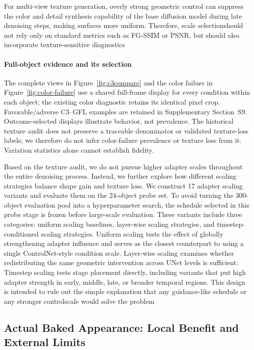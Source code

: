 \documentclass[times,twocolumn,final]{elsarticle}
\providecommand{\DIFadd}[1]{{\protect\color{blue} \sf #1}} %
\providecommand{\DIFdel}[1]{{\protect\color{red} \scriptsize #1}} %
\providecommand{\DIFaddbegin}{} %
\providecommand{\DIFaddend}{} %
\providecommand{\DIFdelbegin}{} %
\providecommand{\DIFdelend}{} %
\begin{document}
\DIFdelbegin \DIFdel{For multi-view texture generation, overly strong geometric control can suppress the color and detail synthesis capability of the base diffusion model during late denoising steps, making surfaces more uniform. Therefore, scale selectionshould not rely only on standard metrics such as FG-SSIM or PSNR, but should also incorporate texture-sensitive diagnostics}\DIFdelend \DIFaddbegin \paragraph{Full-object evidence and its selection}
\DIFadd{The complete views in Figure~\ref{fig:c3compare} and the color failure in Figure~\ref{fig:color-failure} use a shared full-frame display for every condition within each object; the existing color diagnostic retains its identical pixel crop. Favorable/adverse C3--GFL examples are retained in Supplementary Section~S9. Outcome-selected displays illustrate behavior, not prevalence. The historical texture audit does not preserve a traceable denominator or validated texture-loss labels; we therefore do not infer color-failure prevalence or texture loss from it. Variation statistics alone cannot establish fidelity}\DIFaddend .


\DIFdelbegin %

\DIFdel{Based on the texture audit, we do not pursue higher adapter scales throughout the entire denoising process. Instead, we further explore how different scaling strategies balance shape gain and texture loss. We construct 17 adapter scaling variants and evaluate them on the 24-object probe set. To avoid turning the 300-object evaluation pool into a hyperparameter search, the schedule selected in this probe stage is frozen before large-scale evaluation. These variants include three categories: uniform scaling baselines, layer-wise scaling strategies, and timestep-conditioned scaling strategies.
Uniform scaling tests the effect of globally strengthening adapter influence and serves as the closest counterpart to using a single ControlNet-style condition scale. Layer-wise scaling examines whether redistributing the same geometric intervention across UNet levels is sufficient. Timestep scaling tests stage placement directly, including variants that put high adapter strength in early, middle, late, or broader temporal regions. This design is intended to rule out the simple explanation that any guidance-like schedule or any stronger controlscale would solve the problem}\DIFdelend \DIFaddbegin \subsection{Actual Baked Appearance: Local Benefit and External Limits}
\label{subsec:new-bake}
\end{document}
